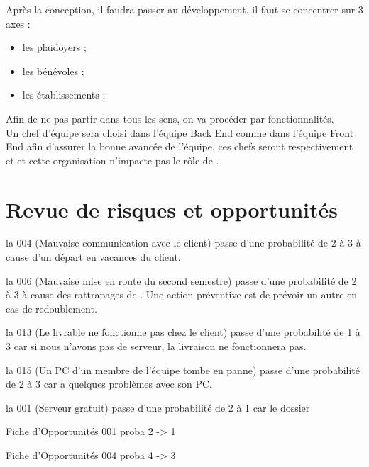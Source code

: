 \documentclass [a4paper] {article}
\begin{document}
\indent
Après la conception, il faudra passer au développement. il faut se concentrer sur 3 axes : 
\begin{itemize}
\item les plaidoyers ;
\item les bénévoles ;
\item les établissements ;
\end{itemize}
Afin de ne pas partir dans tous les sens, on va procéder par fonctionnalités. \\

\indent
Un chef d'équipe sera choisi dans l'équipe Back End comme dans l'équipe Front End afin d'assurer la bonne avancée de l'équipe. ces chefs seront respectivement \Florian{} et \Julie{} et cette organisation n'impacte pas le rôle de \Michel.



\section{Revue de risques et opportunités}

la \FDR{} 004 (Mauvaise communication avec le client) passe d'une probabilité de 2 à 3 à cause d'un départ en vacances du client.



la \FDR{} 006 (Mauvaise mise en route du second semestre) passe d'une probabilité de 2 à 3 à cause des rattrapages de \Pierre. Une action préventive est de prévoir un autre \CP{} en cas de redoublement.

la \FDR{} 013 (Le livrable ne fonctionne pas chez le client) passe d'une probabilité de 1 à 3 car si nous n'avons pas de serveur, la livraison ne fonctionnera pas.

la \FDR{} 015 (Un PC d’un membre de l’équipe tombe en panne) passe d'une probabilité de 2 à 3 car \Florian{} a quelques problèmes avec son PC.

la \FDO{} 001 (Serveur gratuit) passe d'une probabilité de 2 à 1 car le dossier 


Fiche d’Opportunités 001 proba 2 -> 1 

Fiche d’Opportunités 004 proba 4 -> 3

 



\end{document}
